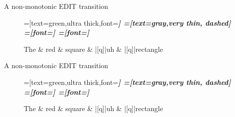 \documentclass{lecture}
\begin{document}
\begin{plain}{A non-monotonic EDIT transition}

\begin{figure}
    \centering
    \begin{dependency}[theme=simple]
    =[text=green,ultra thick,font=\bfseries\itshape]
    =[text=gray,very thin, dashed]
    =[font=\bfseries\itshape]
    =[font=\itshape]
    \begin{deptext}[column sep=.075cm, row sep=.1ex]
        The \& red \& square \& |[q]|uh \& |[q]|rectangle \\
    \end{deptext}
\end{dependency}
\end{figure}
\end{plain}


\begin{plain}{A non-monotonic EDIT transition}

\begin{figure}
    \centering
    \begin{dependency}[theme=simple]
    =[text=green,ultra thick,font=\bfseries\itshape]
    =[text=gray,very thin, dashed]
    =[font=\bfseries\itshape]
    =[font=\itshape]
    \begin{deptext}[column sep=.075cm, row sep=.1ex]
        The \& red \& square \& |[q]|uh \& |[q]|rectangle \\
    \end{deptext}
\end{dependency}
\end{figure}
\end{plain}
\end{document}
